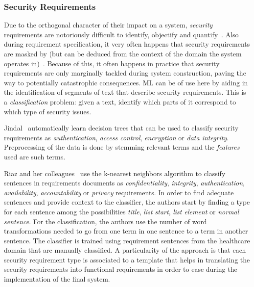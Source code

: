 \subsubsection{Security Requirements}

Due to the orthogonal character of their impact on a system, \emph{security}
requirements are notoriously difficult to identify, objectify and
quantify~\cite{Rashid:2016}. Also during requirement specification, it very
often happens that security requirements are masked by \FRs (but can be
deduced from the context of the domain the system operates in)~\cite{Riaz:2014}.
Because of this, it often happens in practice that security requirements are
only marginally tackled during system construction, paving the way
to potentially catastrophic consequences.
ML can be of use here by aiding in the identification of segments
of text that describe security requirements. This is a \emph{classification}
problem: given a text, identify which parts of it correspond to which type of
security issues.

Jindal\etal~\cite{Jildal:2016} automatically learn decision trees that can be
used to classify security requirements as \emph{authentication}, \emph{access
control}, \emph{encryption} or \emph{data integrity}. Preprocessing of the data
is done by stemming relevant terms and the \emph{features} used
are such terms.

Riaz and her colleagues~\cite{Riaz:2014} use the k-nearest neighbors algorithm
to classify sentences in requirements documents as \emph{confidentiality},
\emph{integrity}, \emph{authentication}, \emph{availability},
\emph{accountability} or \emph{privacy} requirements. In order to find adequate
sentences and provide context to the classifier, the authors start by finding a
type for each sentence among the possibilities \emph{title}, \emph{list start},
\emph{list element} or \emph{normal sentence}. For the classification, the
authors use the number of word transformations needed to go from one term in one sentence to a term in
another sentence. The classifier is trained using requirement sentences from
the healthcare domain that are manually classified. A particularity of the
approach is that each security requirement type is associated to a template that
helps in translating the security requirements into functional requirements in
order to ease during the implementation of the final system.

